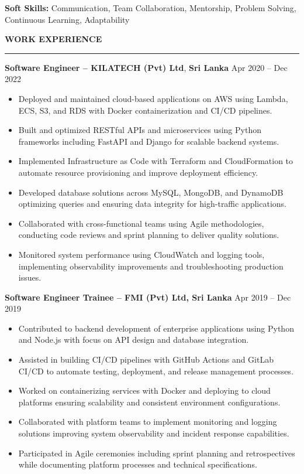 \documentclass[10pt,letterpaper]{article}
\begin{document}
\textbf{Soft Skills:} Communication, Team Collaboration, Mentorship, Problem Solving, Continuous Learning, Adaptability

\vspace{8pt}

\textbf{WORK EXPERIENCE}\\[-8pt]
\noindent\rule{\textwidth}{1pt}

\vspace{-2pt}

\textbf{Software Engineer -- KILATECH (Pvt) Ltd}, \textbf{Sri Lanka} \hfill Apr 2020 -- Dec 2022

\vspace{-1pt}

\begin{itemize}
\item Deployed and maintained cloud-based applications on AWS using Lambda, ECS, S3, and RDS with Docker containerization and CI/CD pipelines.
\item Built and optimized RESTful APIs and microservices using Python frameworks including FastAPI and Django for scalable backend systems.
\item Implemented Infrastructure as Code with Terraform and CloudFormation to automate resource provisioning and improve deployment efficiency.
\item Developed database solutions across MySQL, MongoDB, and DynamoDB optimizing queries and ensuring data integrity for high-traffic applications.
\item Collaborated with cross-functional teams using Agile methodologies, conducting code reviews and sprint planning to deliver quality solutions.
\item Monitored system performance using CloudWatch and logging tools, implementing observability improvements and troubleshooting production issues.
\end{itemize}

\textbf{Software Engineer Trainee -- FMI (Pvt) Ltd, Sri Lanka} \hfill Apr 2019 -- Dec 2019

\vspace{-1pt}

\begin{itemize}
\item Contributed to backend development of enterprise applications using Python and Node.js with focus on API design and database integration.
\item Assisted in building CI/CD pipelines with GitHub Actions and GitLab CI/CD to automate testing, deployment, and release management processes.
\item Worked on containerizing services with Docker and deploying to cloud platforms ensuring scalability and consistent environment configurations.
\item Collaborated with platform teams to implement monitoring and logging solutions improving system observability and incident response capabilities.
\item Participated in Agile ceremonies including sprint planning and retrospectives while documenting platform processes and technical specifications.
\end{itemize}
\end{document}
